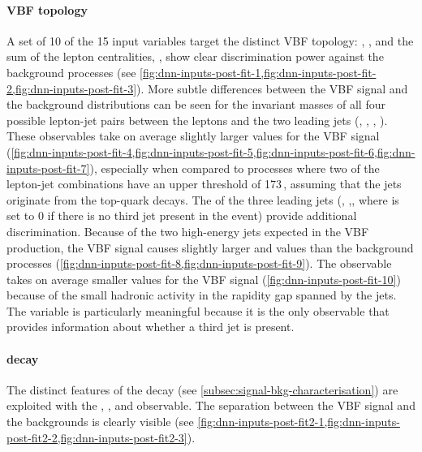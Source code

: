 \paragraph{VBF topology}
A set of 10 of the 15 input variables target the distinct VBF topology: \mjj, \dyjj, and the sum of the lepton centralities, \lepetacent, show clear discrimination power against the background processes (see \cref{fig:dnn-inputs-post-fit-1,fig:dnn-inputs-post-fit-2,fig:dnn-inputs-post-fit-3}). More subtle differences between the VBF signal and the background distributions can be seen for the invariant masses of all four possible lepton-jet pairs between the leptons and the two leading jets (\mlonejone, \mlonejtwo, \mltwojone, \mltwojtwo). These observables take on average slightly larger values for the VBF signal (\cref{fig:dnn-inputs-post-fit-4,fig:dnn-inputs-post-fit-5,fig:dnn-inputs-post-fit-6,fig:dnn-inputs-post-fit-7}), especially when compared to \ttbar processes where two of the lepton-jet combinations have an upper threshold of 173\,\GeV, assuming that the jets originate from the top-quark decays.
The \pT of the three leading jets (\pTjone, \pTjtwo,\pTjthree, where \pTjthree is set to 0 if there is no third jet present in the event) provide additional discrimination.
Because of the two high-energy jets expected in the VBF production, the VBF signal causes slightly larger \pTjone and \pTjtwo values than the background processes (\cref{fig:dnn-inputs-post-fit-8,fig:dnn-inputs-post-fit-9}).
The \pTjthree observable takes on average smaller values for the VBF signal (\cref{fig:dnn-inputs-post-fit-10}) because of the small hadronic activity in the rapidity gap spanned by the jets. The \pTjthree variable is particularly meaningful because it is the only observable that provides information about whether a third jet is present.

\paragraph{\HWW decay}
The distinct features of the \HWW decay (see \cref{subsec:signal-bkg-characterisation}) are exploited with the \dphill, \mll, and \mT observable.
The separation between the VBF signal and the backgrounds is clearly visible (see \cref{fig:dnn-inputs-post-fit2-1,fig:dnn-inputs-post-fit2-2,fig:dnn-inputs-post-fit2-3}).

